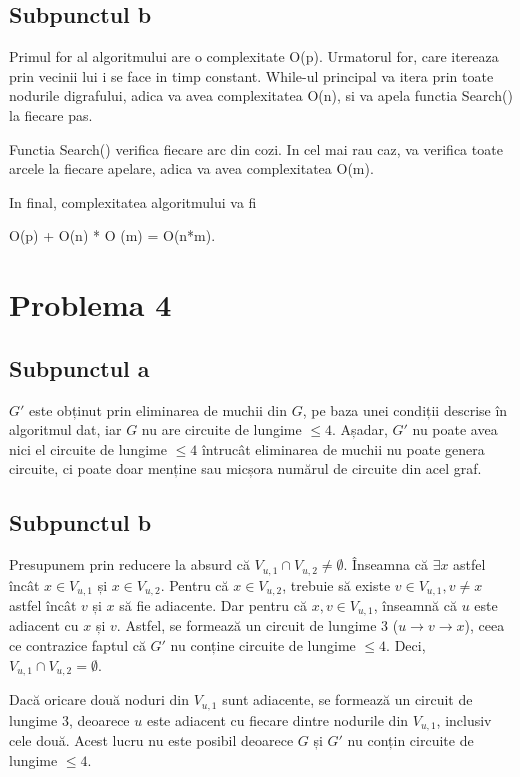 \documentclass{article}
\begin{document}
\subsection*{\fontsize{16}{30}\selectfont Subpunctul b}
{\fontsize{14}{16}\selectfont
Primul for al algoritmului are o complexitate O(p). Urmatorul for, care itereaza prin vecinii lui i se face in timp constant. While-ul principal va itera prin toate nodurile digrafului, adica va avea complexitatea O(n), si va apela functia Search() la fiecare pas.

Functia Search() verifica fiecare arc din cozi. In cel mai rau caz, va verifica toate arcele la fiecare apelare, adica va avea complexitatea O(m).

In final, complexitatea algoritmului va fi  \\ \centerline {O(p) + O(n) * O (m) = O(n*m).}
}

\section*{\fontsize{20}{50}\selectfont Problema 4}

\subsection*{\fontsize{16}{30}\selectfont Subpunctul a}
{\fontsize{14}{16}\selectfont
\par $G'$ este obținut prin eliminarea de muchii din $G$, pe baza unei condiții descrise în algoritmul dat, iar $G$ nu are circuite de lungime $\le 4$. Așadar, $G'$ nu poate avea nici el circuite de lungime $\le 4$ întrucât eliminarea de muchii nu poate genera circuite, ci poate doar menține sau micșora numărul de circuite din acel graf.}

\subsection*{\fontsize{16}{30}\selectfont Subpunctul b}
{\fontsize{14}{16}\selectfont
\par Presupunem prin reducere la absurd că $V_{u,1} \cap V_{u,2} \neq \emptyset$. Înseamna că $\exists x$ astfel încât $x \in V_{u,1}$ și $x \in V_{u,2}$. Pentru că $x \in V_{u,2}$, trebuie să existe $v \in V_{u,1}, v \ne x$ astfel încât $v$ și $x$ să fie adiacente. Dar pentru că $x,v \in V_{u,1}$, înseamnă că $u$ este adiacent cu $x$ și $v$. Astfel, se formează un circuit de lungime 3 ($u \rightarrow v \rightarrow x$), ceea ce contrazice faptul că $G'$ nu conține circuite de lungime $\le 4$. Deci, $V_{u,1} \cap V_{u,2} = \emptyset$.}

{\fontsize{14}{16}\selectfont
\par Dacă oricare două noduri din $V_{u,1}$ sunt adiacente, se formează un circuit de lungime 3, deoarece $u$ este adiacent cu fiecare dintre nodurile din $V_{u,1}$, inclusiv cele două. Acest lucru nu este posibil deoarece $G$ și $G'$ nu conțin circuite de lungime $\le 4$.}
\end{document}
